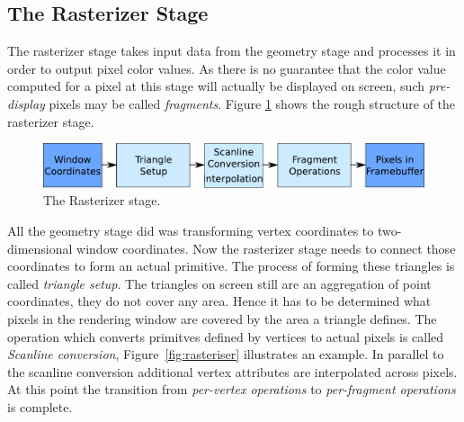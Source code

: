 \subsection{The Rasterizer Stage}
The rasterizer stage takes input data from the geometry stage and processes it
in order to output pixel color values. As there is no guarantee that the color
value computed for a pixel at this stage will actually be displayed on screen,
such \textit{pre-display} pixels may be called \textit{fragments}. Figure
\ref{fig:RasterizerStage} shows the rough structure of the rasterizer stage.
\begin{figure}
\begin{center}
\includegraphics[scale=0.5]{Images/Rasterizer-Stage.pdf}
\caption{The Rasterizer stage.}
\label{fig:RasterizerStage}
\end{center}
\end{figure}
All the geometry stage did was transforming vertex coordinates to
two-dimensional window coordinates. Now the rasterizer stage needs to connect
those coordinates to form an actual primitive. The process of forming these
triangles is called \textit{triangle setup}. The triangles on screen still are
an aggregation of point coordinates, they do not cover any area. Hence it has
to be determined what pixels in the rendering window are covered by the area
a triangle defines. The operation which converts primitves defined by
vertices to actual pixels is called \textit{Scanline conversion},
Figure~\ref{fig:rasteriser} illustrates an example. In parallel to the scanline
conversion additional vertex attributes are interpolated across pixels. At this
point the transition from \textit{per-vertex operations} to \textit{per-fragment
operations} is complete.
